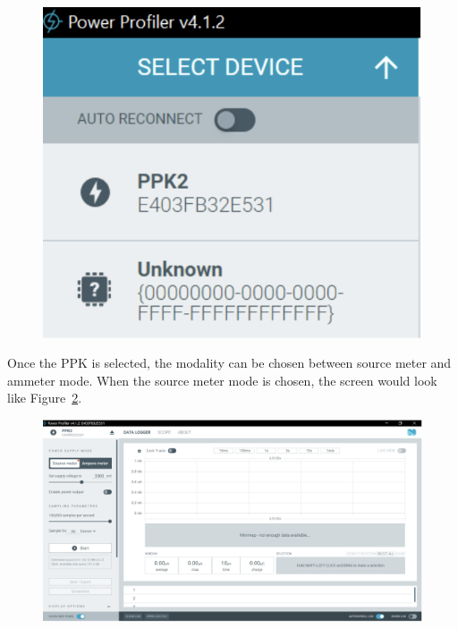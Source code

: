 \documentclass{Configuration_Files/PoliMi3i_thesis}
\begin{document}
\begin{figure}[h]
    \centering
    \includegraphics[scale=0.3]{Test_Procedure/11.png}
    \label{fig:power_profiler_kit_app}
\end{figure}

Once the PPK is selected, the modality can be chosen between source meter and ammeter mode. When the source meter mode is chosen, the screen would look like Figure~\ref{fig:power_profiler_app_source_meter_mode}.

\begin{figure}[h]
    \centering
    \includegraphics[scale=0.3]{Test_Procedure/12.png}
    \label{fig:power_profiler_app_source_meter_mode}
\end{figure}
\end{document}
